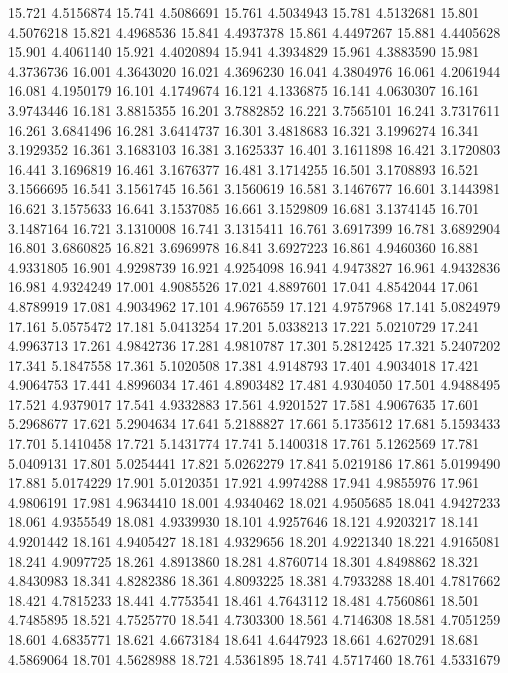 15.721 4.5156874
15.741 4.5086691
15.761 4.5034943
15.781 4.5132681
15.801 4.5076218
15.821 4.4968536
15.841 4.4937378
15.861 4.4497267
15.881 4.4405628
15.901 4.4061140
15.921 4.4020894
15.941 4.3934829
15.961 4.3883590
15.981 4.3736736
16.001 4.3643020
16.021 4.3696230
16.041 4.3804976
16.061 4.2061944
16.081 4.1950179
16.101 4.1749674
16.121 4.1336875
16.141 4.0630307
16.161 3.9743446
16.181 3.8815355
16.201 3.7882852
16.221 3.7565101
16.241 3.7317611
16.261 3.6841496
16.281 3.6414737
16.301 3.4818683
16.321 3.1996274
16.341 3.1929352
16.361 3.1683103
16.381 3.1625337
16.401 3.1611898
16.421 3.1720803
16.441 3.1696819
16.461 3.1676377
16.481 3.1714255
16.501 3.1708893
16.521 3.1566695
16.541 3.1561745
16.561 3.1560619
16.581 3.1467677
16.601 3.1443981
16.621 3.1575633
16.641 3.1537085
16.661 3.1529809
16.681 3.1374145
16.701 3.1487164
16.721 3.1310008
16.741 3.1315411
16.761 3.6917399
16.781 3.6892904
16.801 3.6860825
16.821 3.6969978
16.841 3.6927223
16.861 4.9460360
16.881 4.9331805
16.901 4.9298739
16.921 4.9254098
16.941 4.9473827
16.961 4.9432836
16.981 4.9324249
17.001 4.9085526
17.021 4.8897601
17.041 4.8542044
17.061 4.8789919
17.081 4.9034962
17.101 4.9676559
17.121 4.9757968
17.141 5.0824979
17.161 5.0575472
17.181 5.0413254
17.201 5.0338213
17.221 5.0210729
17.241 4.9963713
17.261 4.9842736
17.281 4.9810787
17.301 5.2812425
17.321 5.2407202
17.341 5.1847558
17.361 5.1020508
17.381 4.9148793
17.401 4.9034018
17.421 4.9064753
17.441 4.8996034
17.461 4.8903482
17.481 4.9304050
17.501 4.9488495
17.521 4.9379017
17.541 4.9332883
17.561 4.9201527
17.581 4.9067635
17.601 5.2968677
17.621 5.2904634
17.641 5.2188827
17.661 5.1735612
17.681 5.1593433
17.701 5.1410458
17.721 5.1431774
17.741 5.1400318
17.761 5.1262569
17.781 5.0409131
17.801 5.0254441
17.821 5.0262279
17.841 5.0219186
17.861 5.0199490
17.881 5.0174229
17.901 5.0120351
17.921 4.9974288
17.941 4.9855976
17.961 4.9806191
17.981 4.9634410
18.001 4.9340462
18.021 4.9505685
18.041 4.9427233
18.061 4.9355549
18.081 4.9339930
18.101 4.9257646
18.121 4.9203217
18.141 4.9201442
18.161 4.9405427
18.181 4.9329656
18.201 4.9221340
18.221 4.9165081
18.241 4.9097725
18.261 4.8913860
18.281 4.8760714
18.301 4.8498862
18.321 4.8430983
18.341 4.8282386
18.361 4.8093225
18.381 4.7933288
18.401 4.7817662
18.421 4.7815233
18.441 4.7753541
18.461 4.7643112
18.481 4.7560861
18.501 4.7485895
18.521 4.7525770
18.541 4.7303300
18.561 4.7146308
18.581 4.7051259
18.601 4.6835771
18.621 4.6673184
18.641 4.6447923
18.661 4.6270291
18.681 4.5869064
18.701 4.5628988
18.721 4.5361895
18.741 4.5717460
18.761 4.5331679
